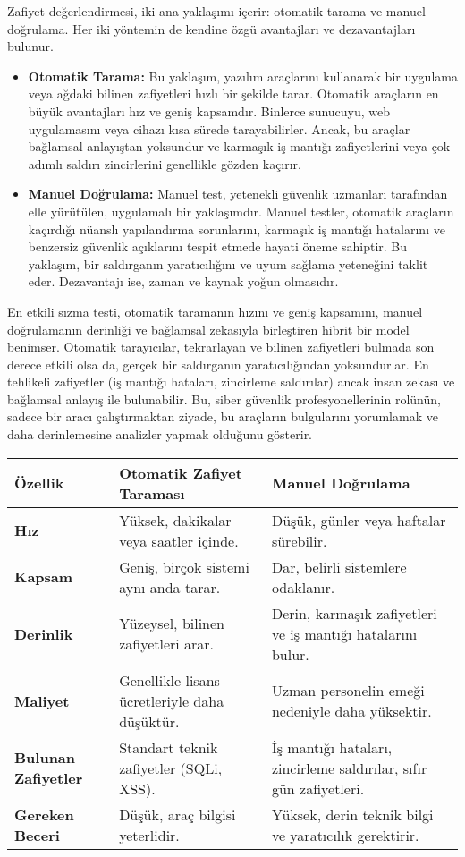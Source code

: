 Zafiyet değerlendirmesi, iki ana yaklaşımı içerir: otomatik tarama ve manuel doğrulama. Her iki yöntemin de kendine özgü avantajları ve dezavantajları bulunur.

\begin{itemize}
\item \textbf{Otomatik Tarama:} Bu yaklaşım, yazılım araçlarını kullanarak bir uygulama veya ağdaki bilinen zafiyetleri hızlı bir şekilde tarar. Otomatik araçların en büyük avantajları hız ve geniş kapsamdır. Binlerce sunucuyu, web uygulamasını veya cihazı kısa sürede tarayabilirler. Ancak, bu araçlar bağlamsal anlayıştan yoksundur ve karmaşık iş mantığı zafiyetlerini veya çok adımlı saldırı zincirlerini genellikle gözden kaçırır.
\item \textbf{Manuel Doğrulama:} Manuel test, yetenekli güvenlik uzmanları tarafından elle yürütülen, uygulamalı bir yaklaşımdır. Manuel testler, otomatik araçların kaçırdığı nüanslı yapılandırma sorunlarını, karmaşık iş mantığı hatalarını ve benzersiz güvenlik açıklarını tespit etmede hayati öneme sahiptir. Bu yaklaşım, bir saldırganın yaratıcılığını ve uyum sağlama yeteneğini taklit eder. Dezavantajı ise, zaman ve kaynak yoğun olmasıdır.
\end{itemize}

En etkili sızma testi, otomatik taramanın hızını ve geniş kapsamını, manuel doğrulamanın derinliği ve bağlamsal zekasıyla birleştiren hibrit bir model benimser. Otomatik tarayıcılar, tekrarlayan ve bilinen zafiyetleri bulmada son derece etkili olsa da, gerçek bir saldırganın yaratıcılığından yoksundurlar. En tehlikeli zafiyetler (iş mantığı hataları, zincirleme saldırılar) ancak insan zekası ve bağlamsal anlayış ile bulunabilir. Bu, siber güvenlik profesyonellerinin rolünün, sadece bir aracı çalıştırmaktan ziyade, bu araçların bulgularını yorumlamak ve daha derinlemesine analizler yapmak olduğunu gösterir.

\begin{tabular}{|l|l|l|}
\hline
\textbf{Özellik} & \textbf{Otomatik Zafiyet Taraması} & \textbf{Manuel Doğrulama} \\
\hline
\textbf{Hız} & Yüksek, dakikalar veya saatler içinde. & Düşük, günler veya haftalar sürebilir. \\
\hline
\textbf{Kapsam} & Geniş, birçok sistemi aynı anda tarar. & Dar, belirli sistemlere odaklanır. \\
\hline
\textbf{Derinlik} & Yüzeysel, bilinen zafiyetleri arar. & Derin, karmaşık zafiyetleri ve iş mantığı hatalarını bulur. \\
\hline
\textbf{Maliyet} & Genellikle lisans ücretleriyle daha düşüktür. & Uzman personelin emeği nedeniyle daha yüksektir. \\
\hline
\textbf{Bulunan Zafiyetler} & Standart teknik zafiyetler (SQLi, XSS). & İş mantığı hataları, zincirleme saldırılar, sıfır gün zafiyetleri. \\
\hline
\textbf{Gereken Beceri} & Düşük, araç bilgisi yeterlidir. & Yüksek, derin teknik bilgi ve yaratıcılık gerektirir. \\
\hline
\end{tabular}


